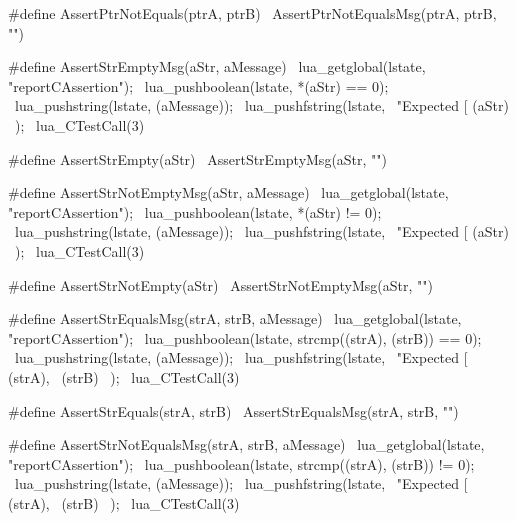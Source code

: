 #define AssertPtrNotEquals(ptrA, ptrB) \
  AssertPtrNotEqualsMsg(ptrA, ptrB, "")
\stopCHeader

\stopTestSuite

\startTestSuite[assertStrEmpty]

\startCHeader
#define AssertStrEmptyMsg(aStr, aMessage)    \
  lua_getglobal(lstate, "reportCAssertion"); \
  lua_pushboolean(lstate, *(aStr) == 0);     \
  lua_pushstring(lstate, (aMessage));        \
  lua_pushfstring(lstate,                    \
      "Expected [%
      (aStr)                                 \
    );                                       \
  lua_CTestCall(3)

#define AssertStrEmpty(aStr) \
  AssertStrEmptyMsg(aStr, "")
\stopCHeader

\stopTestSuite

\startTestSuite[assertStrNotEmpty]

\startCHeader
#define AssertStrNotEmptyMsg(aStr, aMessage) \
  lua_getglobal(lstate, "reportCAssertion"); \
  lua_pushboolean(lstate, *(aStr) != 0);     \
  lua_pushstring(lstate, (aMessage));        \
  lua_pushfstring(lstate,                    \
      "Expected [%
      (aStr)                                 \
    );                                       \
  lua_CTestCall(3)

#define AssertStrNotEmpty(aStr) \
  AssertStrNotEmptyMsg(aStr, "")
\stopCHeader

\stopTestSuite

\startTestSuite[assertStrEquals]

\startCHeader
#define AssertStrEqualsMsg(strA, strB, aMessage)        \
  lua_getglobal(lstate, "reportCAssertion");            \
  lua_pushboolean(lstate, strcmp((strA), (strB)) == 0); \
  lua_pushstring(lstate, (aMessage));                   \
  lua_pushfstring(lstate,                               \
      "Expected [%
      (strA),                                           \
      (strB)                                            \
    );                                                  \
  lua_CTestCall(3)

#define AssertStrEquals(strA, strB) \
  AssertStrEqualsMsg(strA, strB, "")
\stopCHeader

\stopTestSuite

\startTestSuite[assertStrNotEquals]

\startCHeader
#define AssertStrNotEqualsMsg(strA, strB, aMessage)     \
  lua_getglobal(lstate, "reportCAssertion");            \
  lua_pushboolean(lstate, strcmp((strA), (strB)) != 0); \
  lua_pushstring(lstate, (aMessage));                   \
  lua_pushfstring(lstate,                               \
      "Expected [%
      (strA),                                           \
      (strB)                                            \
    );                                                  \
  lua_CTestCall(3)

